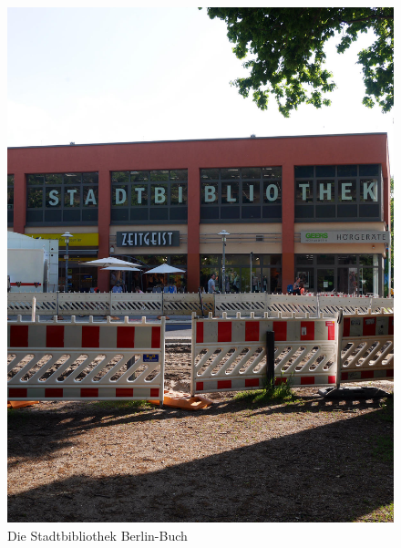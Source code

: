 \documentclass[a4paper,
fontsize=11pt,
oneside,
numbers=noperiodatend,
parskip=half-,
bibliography=totoc,
final
]{scrartcl}
\begin{document}
\begin{figure}
\centering
\includegraphics{img/Bibliothek-Buch-1.jpg}
\caption{Die Stadtbibliothek Berlin-Buch}
\end{figure}
\end{document}
